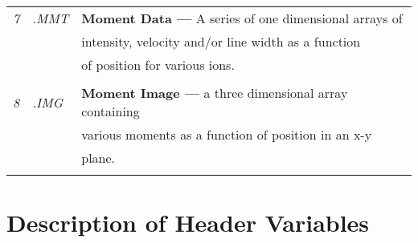 \begin{center}
\begin{tabular}{||l l l||}
{\em 7} & {\em .MMT} & {\bf Moment Data ---} A series of one dimensional arrays of
 \\

        &            & intensity, velocity and/or line width as a function \\
        &            & of position for various ions. \\
        &            &                               \\

{\em 8} & {\em .IMG} & {\bf Moment Image ---} a three dimensional array containing
\\
        &            &  various moments as a function of position in an x-y \\
        &            &  plane. \\
        &            & \\
\hline
\end{tabular}
\end{center}

\newpage

\section{Description of Header Variables}

